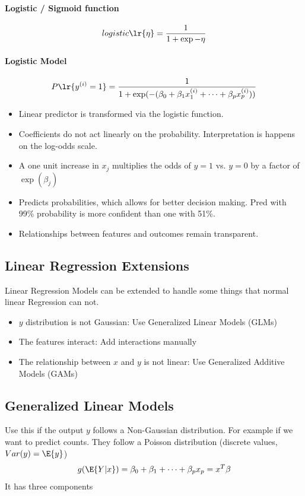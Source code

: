 \paragraph{Logistic / Sigmoid function}
\begin{equation}
	logistic\lr{\eta} = \frac{1}{1+ \exp{-\eta}}
	\label{eq:Log-sigmoid-fun}
\end{equation}

\paragraph{Logistic Model}
\begin{equation}
	P\lr{y^{(i)} = 1}  = \frac{1}{1 + \exp (- (\beta_0 + \beta_1 x_1^{(i)} + \dots + \beta_p x_p^{(i)}))}
	\label{eq:logisticregression}
\end{equation}
\begin{itemize}
	\item Linear predictor is transformed via the logistic function.
	\item Coefficients do not act linearly on the probability. Interpretation is happens on the log-odds scale.
	\item A one unit increase in $x_j$ multiplies the odds of $y=1$ vs. $y=0$ by a factor of $\exp(\beta_j)$
	\item Predicts probabilities, which allows for better decision making. Pred with 99\% probability is more confident than one with 51\%.
	\item Relationships between features and outcomes remain transparent.
\end{itemize}

\subsection{Linear Regression Extensions}
Linear Regression Models can be extended to handle some things that normal linear Regression can not.
\begin{itemize}
	\item $y$ distribution is not Gaussian: Use Generalized Linear Models (GLMs)
	\item The features interact: Add interactions manually
	\item The relationship between $x$ and $y$ is not linear: Use Generalized Additive Models (GAMs)
\end{itemize}

\subsection{Generalized Linear Models}
Use this if the output $y$ follows a Non-Gaussian distribution.
For example if we want to predict counts. They follow a Poisson distribution (discrete values, $Var(y) = \E{y}$)
\begin{equation}
	g(\E{Y|x}) = \beta_0 + \beta_1 +  \dots + \beta_p x_p = x^T\beta
	\label{eq:GLM-formula}
\end{equation}
It has three components

